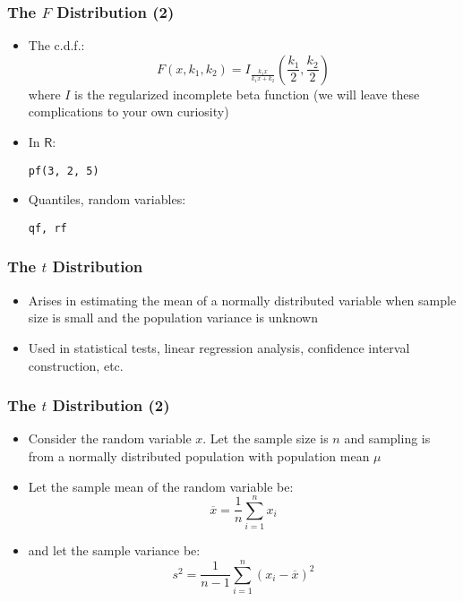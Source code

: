 \documentclass[10pt]{beamer}
\theoremstyle{definition}
\begin{document}
\begin{frame}[fragile]
\frametitle{The $F$ Distribution (2)}
\begin{itemize}
	\item The c.d.f.:
	\[
		F(x,k_{1},k_{2}) = I_{\frac{k_{1}x}{k_{1}x + k_{2}}}\left(\frac{k_{1}}{2},\frac{k_{2}}{2}\right)
	\]
	where $I$ is the regularized incomplete beta function (we will leave these complications to your own curiosity)

	\item In $\mathsf{R}$:
	\begin{lstlisting}[style = rstyle, breaklines]
	pf(3, 2, 5)
	\end{lstlisting}

	\item Quantiles, random variables:
	\begin{lstlisting}[style = rstyle, breaklines]
	qf, rf
	\end{lstlisting}
\end{itemize}
\end{frame}

\begin{frame}[fragile]
\frametitle{The $t$ Distribution}
\begin{itemize}
	\item Arises in estimating the mean of a normally distributed variable when sample size is small and the population variance is unknown

	\item Used in statistical tests, linear regression analysis, confidence interval construction, etc.
\end{itemize}
\end{frame}

\begin{frame}[fragile]
\frametitle{The $t$ Distribution (2)}
\begin{itemize}
	\item Consider the random variable $x$. Let the sample size is $n$ and sampling is from a normally distributed population with population mean $\mu$

	\item Let the sample mean of the random variable be:
	\[
		\overline{x} = \frac{1}{n}\sum_{i=1}^{n} x_{i}
	\]

	\item and let the sample variance be:
	\[
		s^{2} = \frac{1}{n-1}\sum_{i=1}^{n} (x_{i} - \overline{x})^{2}
	\]
\end{itemize}
\end{frame}
\end{document}
